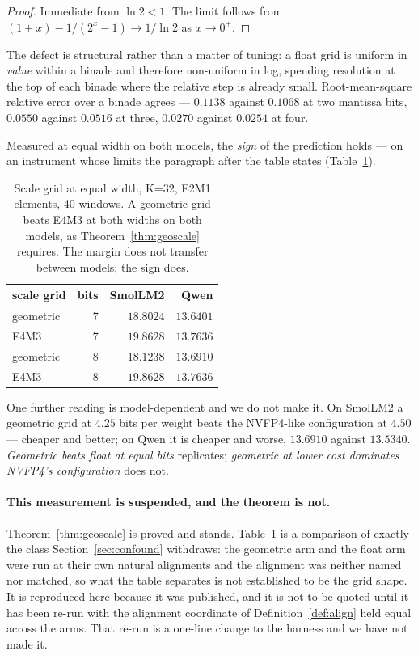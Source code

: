 \documentclass[11pt]{article}
\theoremstyle{definition}
\begin{document}
\begin{proof}
Immediate from $\ln 2 < 1$. The limit follows from
$(1+x)-1 \big/ (2^{x}-1) \to 1/\ln 2$ as $x\to0^{+}$.
\end{proof}

The defect is structural rather than a matter of tuning: a float grid is uniform
in \emph{value} within a binade and therefore non-uniform in log, spending
resolution at the top of each binade where the relative step is already small.
Root-mean-square relative error over a binade agrees --- $0.1138$ against
$0.1068$ at two mantissa bits, $0.0550$ against $0.0516$ at three, $0.0270$
against $0.0254$ at four.

Measured at equal width on both models, the \emph{sign} of the prediction
holds --- on an instrument whose limits the paragraph after the table states
(Table~\ref{tab:geoscale}).

\begin{table}[t]\centering
\caption{Scale grid at equal width, K=32, E2M1 elements, 40 windows. A
geometric grid beats E4M3 at both widths on both models, as
Theorem~\ref{thm:geoscale} requires. The margin does not transfer between
models; the sign does.}
\label{tab:geoscale}
\begin{tabular}{lrrr}
\toprule
scale grid & bits & SmolLM2 & Qwen \\
\midrule
geometric & 7 & $\mathbf{18.8024}$ & $\mathbf{13.6401}$ \\
E4M3      & 7 & $19.8628$ & $13.7636$ \\
\addlinespace
geometric & 8 & $\mathbf{18.1238}$ & $\mathbf{13.6910}$ \\
E4M3      & 8 & $19.8628$ & $13.7636$ \\
\bottomrule
\end{tabular}
\end{table}

One further reading is model-dependent and we do not make it. On SmolLM2 a
geometric grid at $4.25$ bits per weight beats the NVFP4-like configuration at
$4.50$ --- cheaper and better; on Qwen it is cheaper and worse, $13.6910$
against $13.5340$. \emph{Geometric beats float at equal bits} replicates;
\emph{geometric at lower cost dominates NVFP4's configuration} does not.

\paragraph{This measurement is suspended, and the theorem is not.}
Theorem~\ref{thm:geoscale} is proved and stands. Table~\ref{tab:geoscale} is a
comparison of exactly the class Section~\ref{sec:confound} withdraws: the
geometric arm and the float arm were run at their own natural alignments and the
alignment was neither named nor matched, so what the table separates is not
established to be the grid shape. It is reproduced here because it was published,
and it is not to be quoted until it has been re-run with the alignment
coordinate of Definition~\ref{def:align} held equal across the arms. That re-run
is a one-line change to the harness and we have not made it.
\end{document}
